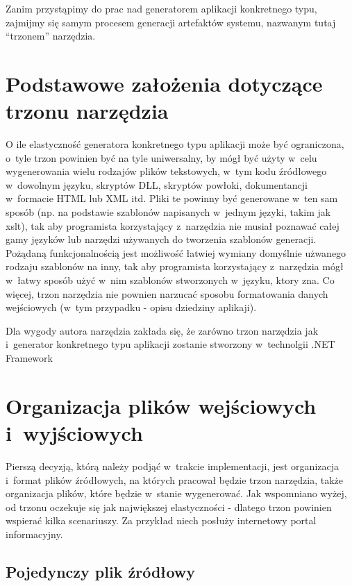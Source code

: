 Zanim przystąpimy do prac nad generatorem aplikacji konkretnego typu, zajmijmy się samym procesem generacji artefaktów systemu, nazwanym tutaj ``trzonem'' narzędzia.



\section{Podstawowe założenia dotyczące trzonu narzędzia}

O ile elastyczność generatora konkretnego typu aplikacji może być ograniczona, o~tyle trzon powinien być na tyle uniwersalny, by mógł być użyty w~celu wygenerowania wielu rodzajów plików tekstowych, w~tym kodu źródłowego w~dowolnym języku, skryptów DLL, skryptów powłoki, dokumentancji w~formacie HTML lub XML itd.
Pliki te powinny być generowane w~ten sam sposób (np. na podstawie szablonów napisanych w~jednym języki, takim jak xslt), tak aby programista korzystający z~narzędzia nie musiał poznawać całej gamy języków lub narzędzi używanych do tworzenia szablonów generacji.
Pożądaną funkcjonalnością jest możliwość łatwiej wymiany domyślnie użwanego rodzaju szablonów na inny, tak aby programista korzystający z~narzędzia mógł w~łatwy sposób użyć w~nim szablonów stworzonych w~języku, ktory zna.
Co więcej, trzon narzędzia nie pownien narzucać sposobu formatowania danych wejściowych (w~tym przypadku - opisu dziedziny aplikaji).

Dla wygody autora narzędzia zakłada się, że zarówno trzon narzędzia jak i~generator konkretnego typu aplikacji zostanie stworzony w~technolgii .NET Framework



\section{Organizacja plików wejściowych i~wyjściowych}

Pierszą decyzją, którą należy podjąć w~trakcie implementacji, jest organizacja i~format plików źródłowych, na których pracował będzie trzon narzędzia, także organizacja plików, które będzie w~stanie wygenerować.
Jak wspomniano wyżej, od trzonu oczekuje się jak największej elastyczności - dlatego trzon powinien wspierać kilka scenariuszy.
Za przykład niech posłuży internetowy portal informacyjny.


\subsection{Pojedynczy plik źródłowy}

